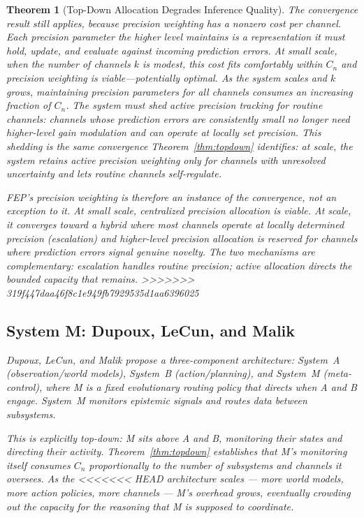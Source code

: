 \documentclass[11pt]{article}
\newtheorem{theorem}{Theorem}
\theoremstyle{definition}
\begin{document}
\begin{theorem}[Top-Down Allocation Degrades Inference Quality]
The convergence result still applies, because precision weighting has
a nonzero cost per channel. Each precision parameter the higher level
maintains is a representation it must hold, update, and evaluate against
incoming prediction errors. At small scale, when the number of
channels $k$ is modest, this cost fits comfortably within $C_n$ and
precision weighting is viable---potentially optimal. As the system
scales and $k$ grows, maintaining precision parameters for all channels
consumes an increasing fraction of $C_n$. The system must shed active
precision tracking for routine channels: channels whose prediction
errors are consistently small no longer need higher-level gain
modulation and can operate at locally set precision. This shedding is
the same convergence Theorem~\ref{thm:topdown} identifies: at scale,
the system retains active precision weighting only for channels with
unresolved uncertainty and lets routine channels self-regulate.

FEP's precision weighting is therefore an instance of the convergence,
not an exception to it. At small scale, centralized precision
allocation is viable. At scale, it converges toward a hybrid where
most channels operate at locally determined precision (escalation) and
higher-level precision allocation is reserved for channels where
prediction errors signal genuine novelty. The two mechanisms are
complementary: escalation handles routine precision; active allocation
directs the bounded capacity that remains.
>>>>>>> 319f447daa46f8c1e949fb7929535d1aa6396025

\subsection{System M: Dupoux, LeCun, and Malik}

Dupoux, LeCun, and Malik \cite{DupouxLeCunMalik2026} propose a
three-component architecture: System~A (observation/world models),
System~B (action/planning), and System~M (meta-control), where M is a
fixed evolutionary routing policy that directs when A and B engage.
System~M monitors epistemic signals and routes data between
subsystems.

This is explicitly top-down: M sits above A and B, monitoring their
states and directing their activity. Theorem~\ref{thm:topdown}
establishes that M's monitoring itself consumes $C_n$ proportionally
to the number of subsystems and channels it oversees. As the
<<<<<<< HEAD
architecture scales --- more world models, more action policies, more
channels --- M's overhead grows, eventually crowding out the capacity
for the reasoning that M is supposed to coordinate.


\end{theorem}
\end{document}
